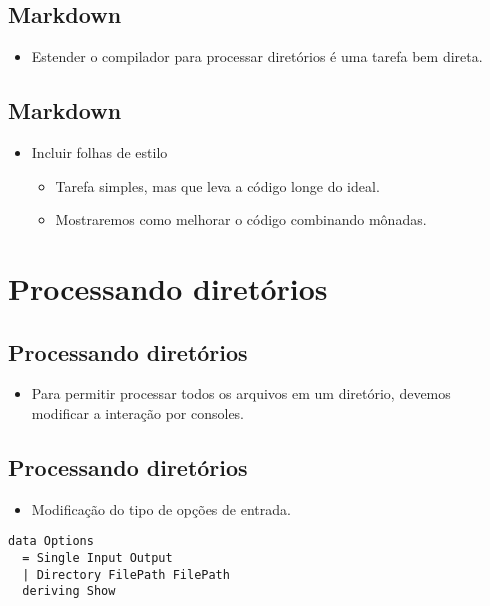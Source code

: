 \documentclass[11pt]{article}
\begin{document}
\subsection*{Markdown}
\label{sec:orgd680866}

\begin{itemize}
\item Estender o compilador para processar diretórios é uma tarefa bem direta.
\end{itemize}
\subsection*{Markdown}
\label{sec:org4e3ab71}

\begin{itemize}
\item Incluir folhas de estilo
\begin{itemize}
\item Tarefa simples, mas que leva a código longe do ideal.
\item Mostraremos como melhorar o código combinando mônadas.
\end{itemize}
\end{itemize}
\section*{Processando diretórios}
\label{sec:org31b1d4d}

\subsection*{Processando diretórios}
\label{sec:org3244b0f}

\begin{itemize}
\item Para permitir processar todos os arquivos em um diretório, devemos modificar a interação por consoles.
\end{itemize}
\subsection*{Processando diretórios}
\label{sec:orgd478255}

\begin{itemize}
\item Modificação do tipo de opções de entrada.
\end{itemize}

\begin{verbatim}
data Options
  = Single Input Output
  | Directory FilePath FilePath
  deriving Show
\end{verbatim}
\end{document}
